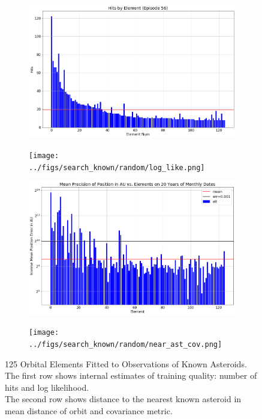 \begin{figure}[h]
\begin{subfigure}[t]{\subfigwidth\textwidth}
\centering
\includegraphics[width=1.0\textwidth]{../figs/search_known/random/hits.png}
\end{subfigure}
\hfill
\begin{subfigure}[t]{\subfigwidth\textwidth}
\centering
\texttt{[image: ../figs/search\_known/random/log\_like.png]}
\end{subfigure}
\medskip
\begin{subfigure}[t]{\subfigwidth\textwidth}
\centering
\includegraphics[width=1.0\textwidth]{../figs/search_known/random/near_ast_dist.png}
\end{subfigure}
\hfill
\begin{subfigure}[t]{\subfigwidth\textwidth}
\centering
\texttt{[image: ../figs/search\_known/random/near\_ast\_cov.png]}
\end{subfigure}
\caption[125 Orbital Elements Fitted to Observations of Known Asteroids]
{125 Orbital Elements Fitted to Observations of Known Asteroids.\\
The first row shows internal estimates of training quality: number of hits and log likelihood.\\
The second row shows distance to the nearest known asteroid in mean distance of orbit and covariance metric.}
\label{fig:TrainRandomKnown}
\end{figure}


